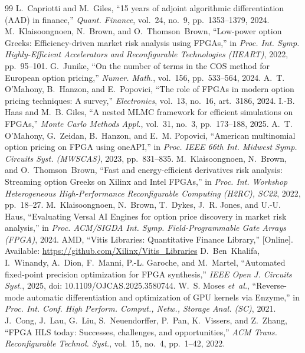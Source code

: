 \documentclass[conference]{IEEEtran}
\begin{document}
\begin{thebibliography}{99}
 L.~Capriotti and M.~Giles, ``15 years of adjoint algorithmic differentiation (AAD) in finance,'' \emph{Quant. Finance}, vol.~24, no.~9, pp.~1353--1379, 2024.
 M.~Klaisoongnoen, N.~Brown, and O.~Thomson~Brown, ``Low-power option Greeks: Efficiency-driven market risk analysis using FPGAs,'' in \emph{Proc. Int. Symp. Highly-Efficient Accelerators and Reconfigurable Technologies (HEART)}, 2022, pp.~95--101.
 G.~Junike, ``On the number of terms in the COS method for European option pricing,'' \emph{Numer. Math.}, vol.~156, pp.~533--564, 2024.
 A.~T. O'Mahony, B.~Hanzon, and E.~Popovici, ``The role of FPGAs in modern option pricing techniques: A survey,'' \emph{Electronics}, vol.~13, no.~16, art.~3186, 2024.
 I.-B. Haas and M.~B. Giles, ``A nested MLMC framework for efficient simulations on FPGAs,'' \emph{Monte Carlo Methods Appl.}, vol.~31, no.~3, pp.~173--188, 2025.
 A.~T. O'Mahony, G.~Zeidan, B.~Hanzon, and E.~M. Popovici, ``American multinomial option pricing on FPGA using oneAPI,'' in \emph{Proc. IEEE 66th Int. Midwest Symp. Circuits Syst. (MWSCAS)}, 2023, pp.~831--835.
 M.~Klaisoongnoen, N.~Brown, and O.~Thomson~Brown, ``Fast and energy-efficient derivatives risk analysis: Streaming option Greeks on Xilinx and Intel FPGAs,'' in \emph{Proc. Int. Workshop Heterogeneous High-Performance Reconfigurable Computing (H2RC), SC22}, 2022, pp.~18--27.
 M.~Klaisoongnoen, N.~Brown, T.~Dykes, J.~R. Jones, and U.-U. Haus, ``Evaluating Versal AI Engines for option price discovery in market risk analysis,'' in \emph{Proc. ACM/SIGDA Int. Symp. Field-Programmable Gate Arrays (FPGA)}, 2024.
 AMD, ``Vitis Libraries: Quantitative Finance Library,'' [Online]. Available: \url{https://github.com/Xilinx/Vitis_Libraries}
 D.~Ben~Khalifa, I.~Winandy, A.~Dion, F.~Manni, P.-L. Garoche, and M.~Martel, ``Automated fixed-point precision optimization for FPGA synthesis,'' \emph{IEEE Open J. Circuits Syst.}, 2025, doi: 10.1109/OJCAS.2025.3580744.
 W.~S. Moses \emph{et~al.}, ``Reverse-mode automatic differentiation and optimization of GPU kernels via Enzyme,'' in \emph{Proc. Int. Conf. High Perform. Comput., Netw., Storage Anal. (SC)}, 2021.
 J.~Cong, J.~Lau, G.~Liu, S.~Neuendorffer, P.~Pan, K.~Vissers, and Z.~Zhang, ``FPGA HLS today: Successes, challenges, and opportunities,'' \emph{ACM Trans. Reconfigurable Technol. Syst.}, vol.~15, no.~4, pp.~1--42, 2022.
\end{thebibliography}
\end{document}
